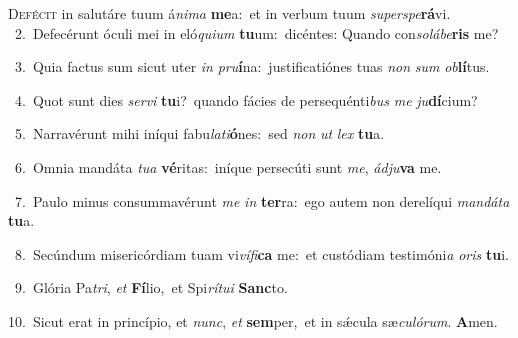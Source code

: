 \lettrine{\initial\textcolor{\initialcolor}{D}}{efécit} in salutáre tuum á\-\textit{ni}\-\textit{ma} \textbf{me}\-a:~\star et in verbum tuum \textit{su}\-\textit{per}\textit{spe}\textbf{rá}vi.\\
{\numbfont\textcolor{\numbcolor}{~2.}}~Defecérunt óculi mei in eló\-\textit{qui}\-\textit{um} \textbf{tu}\-um:~\star dicéntes: Quando con\-\textit{so}\-\textit{lá}\textit{be}\textbf{ris} me?\par
{\numbfont\textcolor{\numbcolor}{~3.}}~Quia factus sum sicut uter \textit{in} \textit{pru}\-\textbf{í}na:~\star justificatiónes tuas \textit{non} \textit{sum} \textit{ob}\-\textbf{lí}tus.\par
{\numbfont\textcolor{\numbcolor}{~4.}}~Quot sunt dies \textit{ser}\-\textit{vi} \textbf{tu}\-i?~\star quando fácies de persequénti\textit{bus} \textit{me} \textit{ju}\-\textbf{dí}cium?\par
{\numbfont\textcolor{\numbcolor}{~5.}}~Narravérunt mihi iníqui fabu\-\textit{la}\-\textit{ti}\textbf{ó}nes:~\star sed \textit{non} \textit{ut} \textit{lex} \textbf{tu}\-a.\par
{\numbfont\textcolor{\numbcolor}{~6.}}~Omnia mandáta \textit{tu}\-\textit{a} \textbf{vé}\-ritas:~\star iníque persecúti sunt \textit{me}\-, \textit{ád}\-\textit{ju}\textbf{va} me.\par
{\numbfont\textcolor{\numbcolor}{~7.}}~Paulo minus consummavérunt \textit{me} \textit{in} \textbf{ter}\-ra:~\star ego autem non derelíqui \textit{man}\-\textit{dá}\textit{ta} \textbf{tu}\-a.\par
{\numbfont\textcolor{\numbcolor}{~8.}}~Secúndum misericórdiam tuam vi\-\textit{ví}\-\textit{fi}\textbf{ca} me:~\star et custódiam testimóni\textit{a} \textit{o}\-\textit{ris} \textbf{tu}\-i.\par
{\numbfont\textcolor{\numbcolor}{~9.}}~Glória Pa\-\textit{tri}\-, \textit{et} \textbf{Fí}\-lio,~\star et Spi\-\textit{rí}\-\textit{tu}\textit{i} \textbf{Sanc}\-to.\par
{\numbfont\textcolor{\numbcolor}{10.}}~Sicut erat in princípio, et \textit{nunc}\-, \textit{et} \textbf{sem}\-per,~\star et in sǽcula sæ\-\textit{cu}\-\textit{ló}\textit{rum}. \textbf{A}\-men.\par
